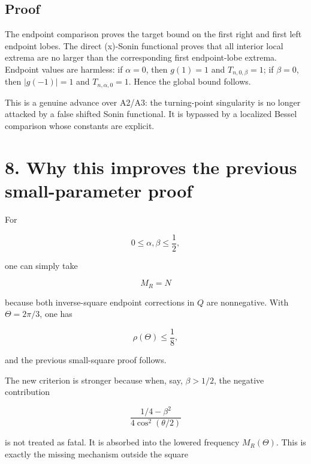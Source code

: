\documentclass[11pt]{article}
\begin{document}
\subsection*{Proof}

The endpoint comparison proves the target bound on the first right and first left endpoint lobes. The direct (x)-Sonin functional proves that all interior local extrema are no larger than the corresponding first endpoint-lobe extrema. Endpoint values are harmless: if \(\alpha=0\), then \(g(1)=1\) and \(T_{n,0,\beta}=1\); if \(\beta=0\), then \(|g(-1)|=1\) and \(T_{n,\alpha,0}=1\). Hence the global bound follows.

This is a genuine advance over A2/A3: the turning-point singularity is no longer attacked by a false shifted Sonin functional. It is bypassed by a localized Bessel comparison whose constants are explicit.



\section*{8. Why this improves the previous small-parameter proof}

For

\begin{equation*}
0\le\alpha,\beta\le\frac12,
\end{equation*}


one can simply take

\begin{equation*}
M_R=N
\end{equation*}


because both inverse-square endpoint corrections in \(Q\) are nonnegative. With \(\Theta=2\pi/3\), one has

\begin{equation*}
\rho(\Theta)\le \frac18,
\end{equation*}


and the previous small-square proof follows.

The new criterion is stronger because when, say, \(\beta>1/2\), the negative contribution

\begin{equation*}
\frac{1/4-\beta^2}{4\cos^2(\theta/2)}
\end{equation*}


is not treated as fatal. It is absorbed into the lowered frequency \(M_R(\Theta)\). This is exactly the missing mechanism outside the square
\end{document}
